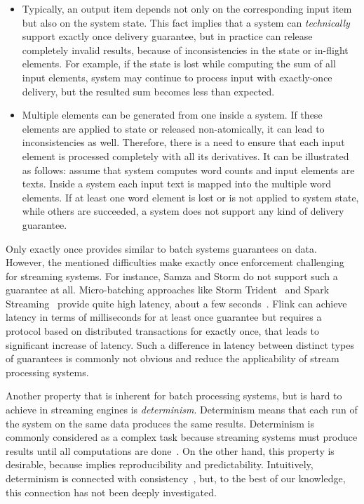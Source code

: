 \begin{itemize}
    \item Typically, an output item depends not only on the corresponding input item but also on the system state. This fact implies that a system can {\em technically} support exactly once delivery guarantee, but in practice can release completely invalid results, because of inconsistencies in the state or in-flight elements. For example, if the state is lost while computing the sum of all input elements, system may continue to process input with exactly-once delivery, but the resulted sum becomes less than expected. 
    \item Multiple elements can be generated from one inside a system. If these elements are applied to state or released non-atomically, it can lead to inconsistencies as well. Therefore, there is a need to ensure that each input element is processed completely with all its derivatives. It can be illustrated as follows: assume that system computes word counts and input elements are texts. Inside a system each input text is mapped into the multiple word elements. If at least one word element is lost or is not applied to system state, while others are succeeded, a system does not support any kind of delivery guarantee. 
\end{itemize}

Only exactly once provides similar to batch systems guarantees on data. However, the mentioned difficulties make exactly once enforcement challenging for streaming systems. For instance, Samza and Storm do not support such a guarantee at all. Micro-batching approaches like Storm Trident~\cite{apache:storm:trident} and Spark Streaming~\cite{Zaharia:2012:DSE:2342763.2342773} provide quite high latency, about a few seconds~\cite{7530084, 7474816}. Flink can achieve latency in terms of milliseconds for at least once guarantee but requires a protocol based on distributed transactions for exactly once, that leads to significant increase of latency. Such a difference in latency between distinct types of guarantees is commonly not obvious and reduce the applicability of stream processing systems.

Another property that is inherent for batch processing systems, but is hard to achieve in streaming engines is {\em determinism}. Determinism means that each run of the system on the same data produces the same results. Determinism is commonly considered as a complex task because streaming systems must produce results until all computations are done~\cite{Zacheilas:2017:MDS:3093742.3093921}. On the other hand, this property is desirable, because implies reproducibility and predictability. Intuitively, determinism is connected with consistency~\cite{Stonebraker:2005:RRS:1107499.1107504}, but, to the best of our knowledge, this connection has not been deeply investigated. 


